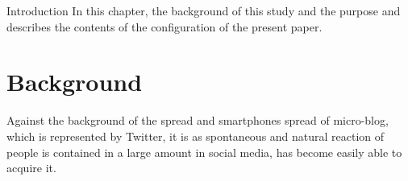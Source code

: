 \chapterhead
{Introduction}
{In this chapter, the background of this study and the purpose and describes the contents of the configuration of the present paper.}


\section{Background}
Against the background of the spread and smartphones spread of micro-blog, which is represented by Twitter, it is as spontaneous and natural reaction of people is contained in a large amount in social media, has become easily able to acquire it.




